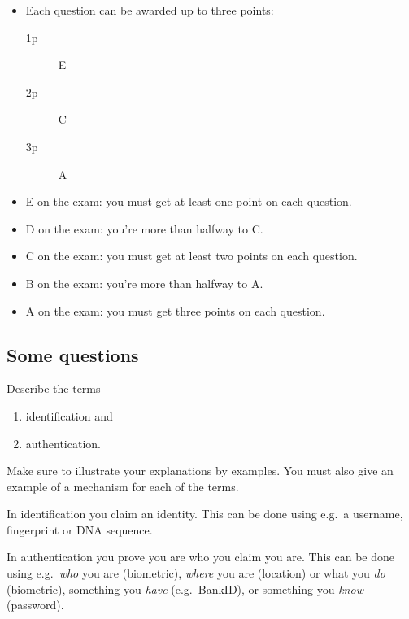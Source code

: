 \begin{frame}
  \begin{itemize}
    \item Each question can be awarded up to three points:
      \begin{description}
        \item[1p] E
        \item[2p] C
        \item[3p] A
      \end{description}
    \item E on the exam: you must get at least one point on each question.
    \item D on the exam: you're more than halfway to C.
    \item C on the exam: you must get at least two points on each question.
    \item B on the exam: you're more than halfway to A.
    \item A on the exam: you must get three points on each question.
  \end{itemize}
\end{frame}

\subsection{Some questions}

\begin{frame}
  \begin{exercise}
    Describe the terms
    \begin{enumerate}
      \item identification and
      \item authentication.
    \end{enumerate}
    Make sure to illustrate your explanations by examples.
    You must also give an example of a mechanism for each of the terms.
  \end{exercise}
\end{frame}

\begin{frame}
  \begin{solution}
    In identification you claim an identity.
    This can be done using e.g.~a username, fingerprint or DNA sequence.

    In authentication you prove you are who you claim you are.
    This can be done using e.g.~\emph{who} you are (biometric), \emph{where} 
    you are (location) or what you \emph{do} (biometric), something you 
    \emph{have} (e.g.~BankID), or something you \emph{know} (password).
  \end{solution}
\end{frame}


